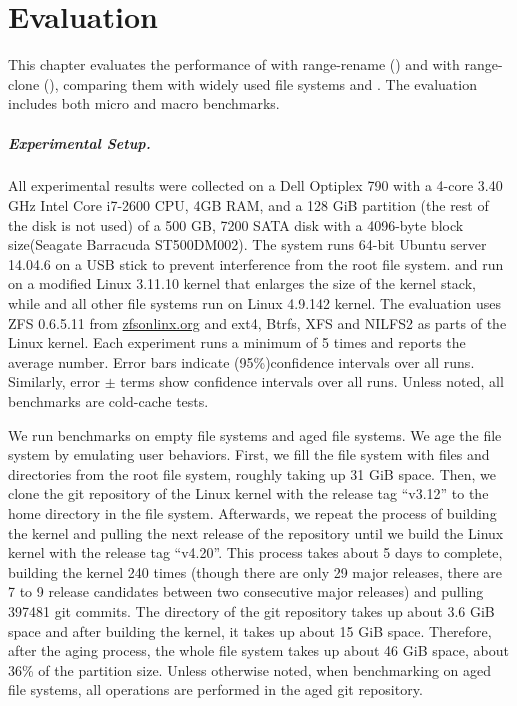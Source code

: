 \chapter{Evaluation}
\label{chap:eval}

This chapter evaluates the performance of \betrfs with
range-rename (\betrfsFour) and \betrfs with range-clone (\betrfsFive),
comparing them with widely used file systems and \betrfsThree.
The evaluation includes both micro and macro benchmarks.

\paragraph{Experimental Setup.}

All experimental results were collected on
a Dell Optiplex 790 with a 4-core 3.40 GHz Intel Core i7-2600 CPU,
4GB RAM,
and a 128 GiB partition (the rest of the disk is not used)
of a 500 GB, 7200 SATA disk with a 4096-byte block size(Seagate Barracuda ST500DM002).
The system runs 64-bit Ubuntu server 14.04.6 on a USB stick to prevent
interference from the root file system.
\betrfsThree and \betrfsFour run on a modified Linux 3.11.10 kernel that
enlarges the size of the kernel stack,
while \betrfsFive and all other file systems run on Linux 4.9.142 kernel.
The evaluation uses ZFS 0.6.5.11 from \url{zfsonlinx.org} and
ext4, Btrfs, XFS and NILFS2 as parts of the Linux kernel.
Each experiment runs a minimum of 5 times and reports the average number.
Error bars indicate (95\%)confidence intervals over all runs.
Similarly, error $\pm$ terms show confidence intervals over all runs.
Unless noted, all benchmarks are cold-cache tests.

We run benchmarks on empty file systems and aged file systems.
We age the file system by emulating user behaviors.
First, we fill the file system with files and directories from the root file
system, roughly taking up 31 GiB space.
Then, we clone the git repository of the Linux kernel with the release tag
``v3.12'' to the home directory in the file system.
Afterwards, we repeat the process of building the kernel and pulling the next
release of the repository
until we build the Linux kernel with the release tag ``v4.20''.
This process takes about 5 days to complete, building the kernel 240 times
(though there are only 29 major releases, there are 7 to 9 release candidates
between two consecutive major releases)
and pulling 397481 git commits.
The directory of the git repository takes up about 3.6 GiB space and
after building the kernel, it takes up about 15 GiB space.
Therefore, after the aging process, the whole file system takes up about 46 GiB
space, about 36\% of the partition size.
Unless otherwise noted, when benchmarking on aged file systems,
all operations are performed in the aged git repository.

